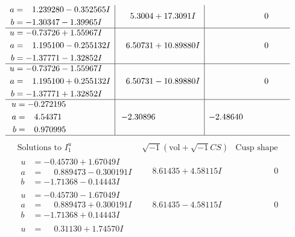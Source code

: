 \documentclass[1p]{elsarticle_modified}
\theoremstyle{definition}
\newcommand{\I}{\sqrt{-1}}
\begin{document}
$$\begin{array}{c|c|c}
\begin{aligned}
a &= \phantom{-}1.239280 - 0.352565 I \\
b &= -1.30347 - 1.39965 I\end{aligned}
 & \phantom{-}5.3004 + 17.3091 I & \phantom{-0.000000 } 0 \\ \hline\begin{aligned}
u &= -0.73726 + 1.55967 I \\
a &= \phantom{-}1.195100 - 0.255132 I \\
b &= -1.37771 - 1.32852 I\end{aligned}
 & \phantom{-}6.50731 + 10.89880 I & \phantom{-0.000000 } 0 \\ \hline\begin{aligned}
u &= -0.73726 - 1.55967 I \\
a &= \phantom{-}1.195100 + 0.255132 I \\
b &= -1.37771 + 1.32852 I\end{aligned}
 & \phantom{-}6.50731 - 10.89880 I & \phantom{-0.000000 } 0 \\ \hline\begin{aligned}
u &= -0.272195\phantom{ +0.000000I} \\
a &= \phantom{-}4.54371\phantom{ +0.000000I} \\
b &= \phantom{-}0.970995\phantom{ +0.000000I}\end{aligned}
 & -2.30896\phantom{ +0.000000I} & -2.48640\phantom{ +0.000000I}\\
 \hline 
 \end{array}$$\newpage$$\begin{array}{c|c|c}  
\text{Solutions to }I^u_{1}& \I (\text{vol} + \sqrt{-1}CS) & \text{Cusp shape}\\
 \hline 
\begin{aligned}
u &= -0.45730 + 1.67049 I \\
a &= \phantom{-}0.889473 - 0.300191 I \\
b &= -1.71368 - 0.14443 I\end{aligned}
 & \phantom{-}8.61435 + 4.58115 I & \phantom{-0.000000 } 0 \\ \hline\begin{aligned}
u &= -0.45730 - 1.67049 I \\
a &= \phantom{-}0.889473 + 0.300191 I \\
b &= -1.71368 + 0.14443 I\end{aligned}
 & \phantom{-}8.61435 - 4.58115 I & \phantom{-0.000000 } 0 \\ \hline\begin{aligned}
u &= \phantom{-}0.31130 + 1.74570 I \\

\end{aligned}
\end{array}$$
\end{document}
